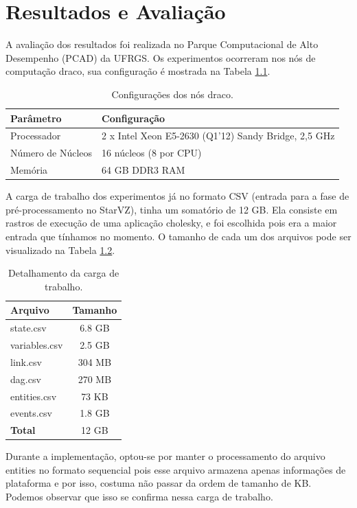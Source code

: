 \chapter{Resultados e Avaliação} \label{ch:evaluation}

A avaliação dos resultados foi realizada no Parque Computacional de Alto 
Desempenho (PCAD) da UFRGS. Os experimentos ocorreram nos nós de 
computação draco, sua configuração é mostrada na Tabela \ref{tab:draco_config}.

\begin{table}[H]
\centering
\begin{tabular}{l l} \toprule
\textbf{Parâmetro}  &  \textbf{Configuração} \\ 
\midrule
Processador     & 2 x Intel Xeon E5-2630 (Q1'12) Sandy Bridge, 2,5 GHz  
\\
Número de Núcleos    & 16 núcleos (8 por CPU)  \\
Memória       & 64 GB DDR3 RAM   \\
\end{tabular}
\caption{Configurações dos nós draco.}
\label{tab:draco_config}
\end{table}

A carga de trabalho dos experimentos já no formato CSV (entrada para a fase de 
pré-processamento no StarVZ), tinha um somatório de 12 GB. Ela consiste em 
rastros de execução de uma aplicação cholesky, e foi escolhida pois era a maior
entrada que tínhamos no momento. O tamanho de cada um dos arquivos pode ser 
visualizado na Tabela \ref{tab:input_sz}.

\begin{table}[H]
\centering
\begin{tabular}{l c} \toprule
\textbf{Arquivo}  &  \textbf{Tamanho} \\ 
\midrule
state.csv	& 6.8 GB \\
variables.csv  	& 2.5 GB \\
link.csv       	& 304 MB \\
dag.csv        	& 270 MB \\
entities.csv	& 73 KB \\
events.csv	& 1.8 GB \\
\textbf{Total}  & 12 GB  \\
\end{tabular}
\caption{Detalhamento da carga de trabalho.}
\label{tab:input_sz}
\end{table}

Durante a implementação, optou-se por manter o processamento do arquivo entities 
no formato sequencial pois esse arquivo armazena apenas informações de 
plataforma e por isso, costuma não passar da ordem de tamanho de KB. Podemos 
observar que isso se confirma nessa carga de trabalho.

